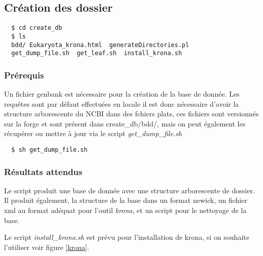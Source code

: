 \subsection{Création des dossier}
\label{createdb}

\begin{verbatim}
  $ cd create_db
  $ ls 
  bdd/ Eukaryota_krona.html  generateDirectories.pl  
  get_dump_file.sh  get_leaf.sh  install_krona.sh
\end{verbatim}
\subsubsection{Prérequis}

Un fichier genbank est nécessaire pour la création de la base de donnée.
Les requêtes sont par défaut effectuées en locale il est donc nécessaire d'avoir la structure arborescente du NCBI 
dans des fchiers plats, ces fichiers sont versionnés sur la forge et sont présent dans create\_db/bdd/, mais on peut également les récupérer ou mettre
à jour via le script\textit{ get\_dump\_file.sh }

\begin{verbatim}
  $ sh get_dump_file.sh
  \end{verbatim}



\subsubsection{Résultats attendus}
Le script produit une base de donnée avec une structure arborescente de dossier. Il produit également, la structure
de la base dans un format newick, un fichier xml au format adéquat pour l'outil \textit{krona}, et un script pour le nettoyage de la base.

Le script \textit{install\_krona.sh} est prévu pour l'installation de krona, si on souhaite l'utiliser voir figure \ref{krona}.


